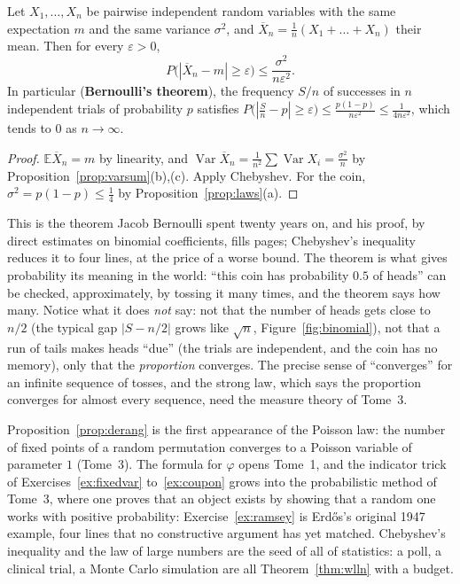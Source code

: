 \begin{theorem}\label{thm:wlln}
Let $X_1,\dots,X_n$ be pairwise independent random variables with the same expectation $m$ and the same variance $\sigma^2$, and $\overline X_n=\frac1n(X_1+\dots+X_n)$ their mean. Then for every $\varepsilon>0$,
\[
P\big(|\overline X_n-m|\ge\varepsilon\big)\le\frac{\sigma^2}{n\varepsilon^2}.
\]
In particular (\textbf{Bernoulli's theorem}), the frequency $S/n$ of successes in $n$ independent trials of probability $p$ satisfies $P\big(\left|\frac Sn-p\right|\ge\varepsilon\big)\le\frac{p(1-p)}{n\varepsilon^2}\le\frac1{4n\varepsilon^2}$, which tends to $0$ as $n\to\infty$.
\end{theorem}
\begin{proof}
$\mathbb E\overline X_n=m$ by linearity, and $\operatorname{Var}\overline X_n=\frac1{n^2}\sum\operatorname{Var}X_i=\frac{\sigma^2}n$ by Proposition~\ref{prop:varsum}(b),(c). Apply Chebyshev. For the coin, $\sigma^2=p(1-p)\le\frac14$ by Proposition~\ref{prop:laws}(a).
\end{proof}

This is the theorem Jacob Bernoulli spent twenty years on, and his proof, by direct estimates on binomial coefficients, fills pages; Chebyshev's inequality reduces it to four lines, at the price of a worse bound. The theorem is what gives probability its meaning in the world: ``this coin has probability $0.5$ of heads'' can be checked, approximately, by tossing it many times, and the theorem says how many. Notice what it does \emph{not} say: not that the number of heads gets close to $n/2$ (the typical gap $|S-n/2|$ grows like $\sqrt n$, Figure~\ref{fig:binomial}), not that a run of tails makes heads ``due'' (the trials are independent, and the coin has no memory), only that the \emph{proportion} converges. The precise sense of ``converges'' for an infinite sequence of tosses, and the strong law, which says the proportion converges for almost every sequence, need the measure theory of Tome~3.

\begin{beauty}
Proposition~\ref{prop:derang} is the first appearance of the Poisson law: the number of fixed points of a random permutation converges to a Poisson variable of
parameter $1$ (Tome~3). The formula for $\varphi$ opens Tome~1, and the indicator trick of Exercises~\ref{ex:fixedvar} to~\ref{ex:coupon} grows into the probabilistic
method of Tome~3, where one proves that an object exists by showing that a random one works with positive probability: Exercise~\ref{ex:ramsey} is Erd\H os's original 1947 example, four lines that no constructive argument has yet matched. Chebyshev's inequality and the law of large numbers are the seed of all of statistics: a poll, a clinical trial, a Monte Carlo simulation are all Theorem~\ref{thm:wlln} with a budget.
\end{beauty}

